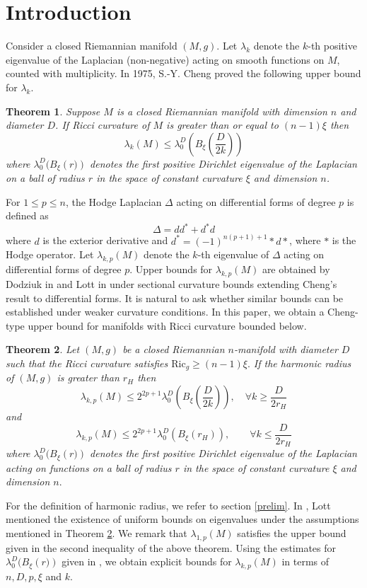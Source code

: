 \documentclass[10 pt, reqno]{amsart}
\newtheorem{theorem}{Theorem}[section]
\begin{document}
\section{Introduction} Consider a closed Riemannian manifold $(M,g)$. Let $\lambda_k$  denote the $k$-th positive eigenvalue of the Laplacian (non-negative) acting on smooth functions on $M$, counted with multiplicity. In 1975, S.-Y. Cheng proved the following upper bound for $\lambda_k$.
\begin{theorem}\cite{Cheng} Suppose $M$ is a closed Riemannian manifold with dimension $n$ and diameter $D$. If Ricci curvature of $M$ is greater than or equal to $(n-1)\xi$ then
$$\lambda_k(M)\leq \lambda_0^D(B_\xi(\frac{D}{2k}))$$
where $\lambda_0^D(B_{\xi}\left(r)\right)$ denotes the first positive Dirichlet eigenvalue of the Laplacian on a ball of radius $r$ in the space of constant curvature $\xi$ and dimension $n$. 
\end{theorem}
  For  $1\le p\le n$, the Hodge Laplacian $\Delta$ acting on differential forms of degree $p$ is defined as 
\[\Delta=dd^*+d^*d\] where $d$ is the exterior derivative and  $d^*=(-1)^{n(p+1)+1}*d*$, where $*$ is the Hodge operator. Let $\lambda_{k,p}(M)$ denote the $k$-th eigenvalue of $\Delta$ acting on differential forms of degree $p$.  Upper bounds for  $\lambda_{k,p}(M)$ are obtained by Dodziuk in \cite{ dodziuk1982} and Lott in \cite{LottJ} under sectional curvature bounds extending Cheng's result to differential forms. It is natural to ask whether similar bounds can be established under weaker curvature conditions. In this paper, we obtain a Cheng-type upper bound for manifolds with  Ricci curvature bounded below. 
\begin{theorem} \label{thm:main_theorem}
Let $(M,g)$ be a closed Riemannian $n$-manifold with diameter $D$ such that the Ricci curvature satisfies $\mathrm{Ric}_g \ge (n-1)\xi .$  If the harmonic radius of $(M,g)$ is greater than $r_H$ then 
\[\lambda_{k,p}(M)\le 2^{2p+1} \lambda_0^D\left(B_\xi\left(\frac{D}{2k}\right)\right), \quad \forall k\ge \frac{D}{2r_H}\]
and \[\lambda_{k,p}(M)\le 2^{2p+1} \lambda_0^D\left(B_\xi(r_H)\right),\qquad \forall k\le \frac{D}{2r_H}\]
where $\lambda_0^D(B_{\xi}\left(r)\right)$ denotes the first positive Dirichlet eigenvalue of the Laplacian acting on functions on a ball of radius $r$ in the space of constant curvature $\xi$ and dimension $n.$
\end{theorem}

For the definition of harmonic radius, we refer to section \ref{prelim}. In \cite{lott2022}, Lott mentioned the existence of uniform bounds on eigenvalues under the assumptions mentioned in Theorem \ref{thm:main_theorem}. We remark that $\lambda_{1,p}(M)$ satisfies the upper bound given in the second inequality of the above theorem. Using the estimates for $\lambda_0^D(B_{\xi}\left(r)\right)$ given in \cite{Cheng}, we obtain explicit bounds for $\lambda_{k,p}(M)$ in terms of $n,D,p,\xi$ and $k.$
\end{document}
